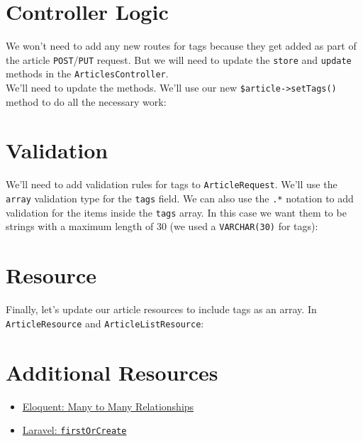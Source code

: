\section{Controller Logic}

We won't need to add any new routes for tags because they get added as part of the article \texttt{POST}/\texttt{PUT} request. But we will need to update the \texttt{store} and \texttt{update} methods in the \texttt{ArticlesController}.
\\

We'll need to update the methods. We'll use our new \texttt{\$article->setTags()} method to do all the necessary work:



\section{Validation}

We'll need to add validation rules for tags to \texttt{ArticleRequest}. We'll use the \texttt{array} validation type for the \texttt{tags} field. We can also use the \texttt{.*} notation to add validation for the items inside the \texttt{tags} array. In this case we want them to be strings with a maximum length of 30 (we used a \texttt{VARCHAR(30)} for tags):



\section{Resource}

Finally, let's update our article resources to include tags as an array. In \texttt{ArticleResource} and \texttt{ArticleListResource}:




\section{Additional Resources}

\begin{itemize}[leftmargin=*]
    \item \href{http://laravel.com/docs/master/eloquent-relationships#many-to-many}{Eloquent: Many to Many Relationships}
    \item \href{http://laravel.com/docs/master/eloquent#other-creation-methods}{Laravel: \texttt{firstOrCreate}}
\end{itemize}
